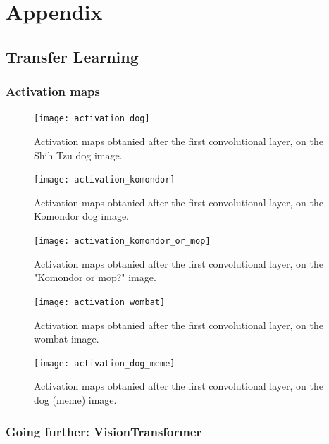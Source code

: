 \chapter{Appendix}
\section{Transfer Learning}
\graphicspath{{figs/2a/}}
\subsection{Activation maps} \label{appendix:activation_maps}

\begin{figure}[H]
    \centering
    \texttt{[image: activation\_dog]}
    \caption{Activation maps obtanied after the first convolutional layer, on the Shih Tzu dog image.}
    \label{fig:activation_dog}
\end{figure} 

\begin{figure}[H]
    \centering
    \texttt{[image: activation\_komondor]}
    \caption{Activation maps obtanied after the first convolutional layer, on the Komondor dog image.}
    \label{fig:activation_komondor}
\end{figure} 

\begin{figure}[H]
    \centering
    \texttt{[image: activation\_komondor\_or\_mop]}
    \caption{Activation maps obtanied after the first convolutional layer, on the "Komondor or mop?" image.}
    \label{fig:activation_komondor_or_mop}
\end{figure} 

\begin{figure}[H]
    \centering
    \texttt{[image: activation\_wombat]}
    \caption{Activation maps obtanied after the first convolutional layer, on the wombat image.}
    \label{fig:activation_wombat}
\end{figure} 

\begin{figure}[H]
    \centering
    \texttt{[image: activation\_dog\_meme]}
    \caption{Activation maps obtanied after the first convolutional layer, on the dog (meme) image.}
    \label{fig:activation_dog_meme}
\end{figure} 

\subsection{Going further: VisionTransformer} \label{appendix:vit}

